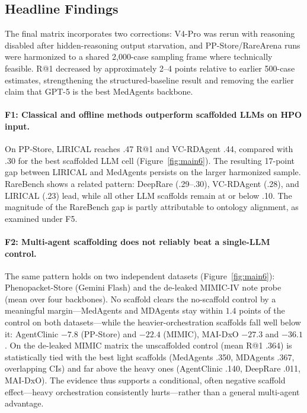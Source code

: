 \documentclass[letterpaper]{article} %
\begin{document}
\subsection{Headline Findings}
\label{sec-6-4}

The final matrix incorporates two corrections: V4-Pro was rerun with reasoning disabled after hidden-reasoning output starvation, and PP-Store/RareArena runs were harmonized to a shared 2,000-case sampling frame where technically feasible. R@1 decreased by approximately 2--4 points relative to earlier 500-case estimates, strengthening the structured-baseline result and removing the earlier claim that GPT-5 is the best MedAgents backbone.

\paragraph{F1: Classical and offline methods outperform scaffolded LLMs on HPO input.}
On PP-Store, LIRICAL reaches .47 R@1 and VC-RDAgent .44, compared with .30 for the best scaffolded LLM cell (Figure~\ref{fig:main6}). The resulting 17-point gap between LIRICAL and MedAgents persists on the larger harmonized sample. RareBench shows a related pattern: DeepRare (.29--.30), VC-RDAgent (.28), and LIRICAL (.23) lead, while all other LLM scaffolds remain at or below .10. The magnitude of the RareBench gap is partly attributable to ontology alignment, as examined under F5.

\paragraph{F2: Multi-agent scaffolding does not reliably beat a single-LLM control.}
The same pattern holds on two independent datasets (Figure~\ref{fig:main6}): Phenopacket-Store (Gemini Flash) and the de-leaked MIMIC-IV note probe (mean over four backbones). No scaffold clears the no-scaffold control by a meaningful margin---MedAgents and MDAgents stay within $1.4$ points of the control on both datasets---while the heavier-orchestration scaffolds fall well below it: AgentClinic $-7.8$ (PP-Store) and $-22.4$ (MIMIC), MAI-DxO $-27.3$ and $-36.1$. On the de-leaked MIMIC matrix the unscaffolded control (mean R@1 .364) is statistically tied with the best light scaffolds (MedAgents .350, MDAgents .367, overlapping CIs) and far above the heavy ones (AgentClinic .140, DeepRare .011, MAI-DxO). The evidence thus supports a conditional, often negative scaffold effect---heavy orchestration consistently hurts---rather than a general multi-agent advantage.
\end{document}
